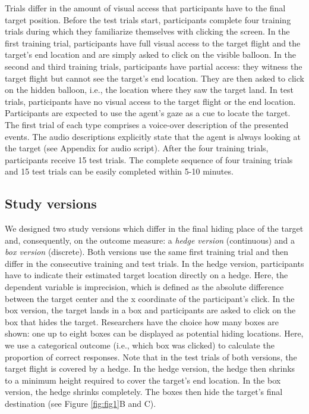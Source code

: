 \documentclass[
  man,floatsintext]{apa6}
\begin{document}
Trials differ in the amount of visual access that participants have to the final target position. Before the test trials start, participants complete four training trials during which they familiarize themselves with clicking the screen. In the first training trial, participants have full visual access to the target flight and the target's end location and are simply asked to click on the visible balloon. In the second and third training trials, participants have partial access: they witness the target flight but cannot see the target's end location. They are then asked to click on the hidden balloon, i.e., the location where they saw the target land. In test trials, participants have no visual access to the target flight or the end location. Participants are expected to use the agent's gaze as a cue to locate the target. The first trial of each type comprises a voice-over description of the presented events. The audio descriptions explicitly state that the agent is always looking at the target (see Appendix for audio script). After the four training trials, participants receive 15 test trials. The complete sequence of four training trials and 15 test trials can be easily completed within 5-10 minutes.

\hypertarget{study-versions}{%
\subsection{Study versions}\label{study-versions}}

We designed two study versions which differ in the final hiding place of the target and, consequently, on the outcome measure: a \emph{hedge version} (continuous) and a \emph{box version} (discrete). Both versions use the same first training trial and then differ in the consecutive training and test trials.
In the hedge version, participants have to indicate their estimated target location directly on a hedge. Here, the dependent variable is imprecision, which is defined as the absolute difference between the target center and the x coordinate of the participant's click.
In the box version, the target lands in a box and participants are asked to click on the box that hides the target. Researchers have the choice how many boxes are shown: one up to eight boxes can be displayed as potential hiding locations. Here, we use a categorical outcome (i.e., which box was clicked) to calculate the proportion of correct responses.
Note that in the test trials of both versions, the target flight is covered by a hedge. In the hedge version, the hedge then shrinks to a minimum height required to cover the target's end location. In the box version, the hedge shrinks completely. The boxes then hide the target's final destination (see Figure \ref{fig:fig1}B and C).
\end{document}
